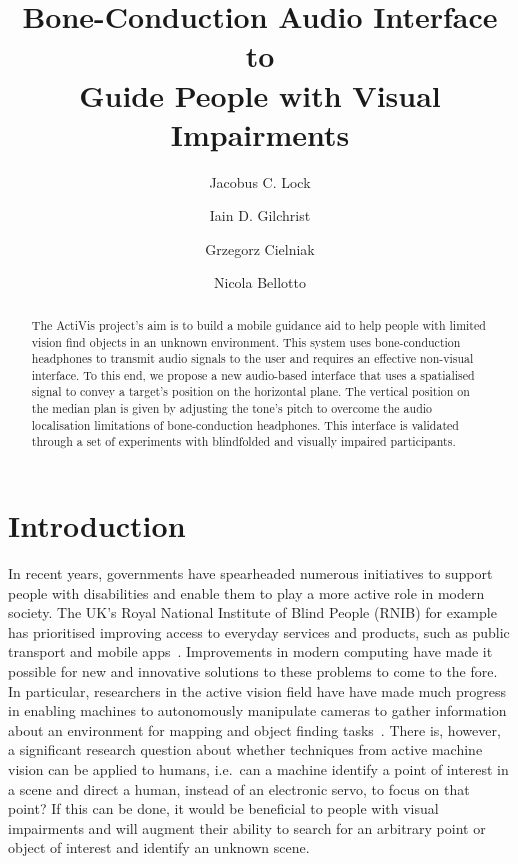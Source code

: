 \documentclass{llncs}
\begin{document}
\title{Bone-Conduction Audio Interface to\\Guide People with Visual Impairments}

\author{Jacobus C. Lock \and 
Iain D. Gilchrist \and
Grzegorz Cielniak \and
Nicola Bellotto}



\maketitle
\setcounter{footnote}{0}

\begin{abstract}
  The ActiVis project's aim is to build a mobile guidance aid to help people with limited vision find objects in an unknown environment.
  This system uses bone-conduction headphones to transmit audio signals to the user and requires an effective non-visual interface.
  To this end, we propose a new audio-based interface that uses a spatialised signal to convey a target's position on the horizontal plane. 
  The vertical position on the median plan is given by adjusting the tone's pitch to overcome the audio localisation limitations of bone-conduction headphones. 
  This interface is validated through a set of experiments with blindfolded and visually impaired participants. 
\end{abstract} 

\section{Introduction}

In recent years, governments have spearheaded numerous initiatives to support people with disabilities and enable them to play a more active role in modern society.
The UK's Royal National Institute of Blind People (RNIB) for example has prioritised improving access to everyday services and products, such as public transport and mobile apps~\cite{rnib2016uk}.
Improvements in modern computing have made it possible for new and innovative solutions to these problems to come to the fore.
In particular, researchers in the active vision field have have made much progress in enabling machines to autonomously manipulate cameras to gather information about an environment for mapping and object finding tasks~\cite{bajcsy2018revisiting,lock2019active}.
There is, however, a significant research question about whether techniques from active machine vision can be applied to humans, i.e.\ can a machine identify a point of interest in a scene and direct a human, instead of an electronic servo, to focus on that point?
If this can be done, it would be beneficial to people with visual impairments and will augment their ability to search for an arbitrary point or object of interest and identify an unknown scene. 
\end{document}
